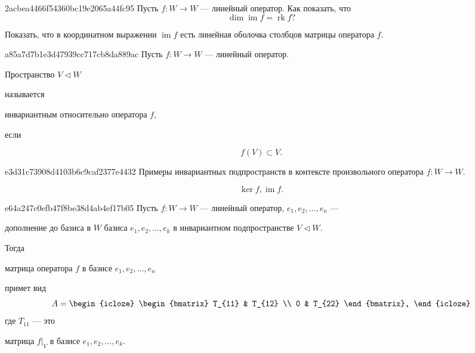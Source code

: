 \begin{note}{2acbea4466f54360bc19e2065a44fc95}
    Пусть \( f : W \to W \) --- линейный оператор. Как показать, что
    \[
        \dim \operatorname{im} f = \operatorname{rk} f?
    \]

    \begin{cloze}{1}
        Показать, что в координатном выражении \( \operatorname{im} f \) есть линейная оболочка столбцов матрицы оператора \( f \).
    \end{cloze}
\end{note}

\begin{note}{a85a7d7b1e3d47939cc717cb8da889ac}
    Пусть \( f : W \to W \) --- линейный оператор. \begin{icloze}{1}Пространство \( V \triangleleft W \)\end{icloze} называется \begin{icloze}{2}инвариантным относительно оператора \( f \),\end{icloze} если
    \begin{icloze}{1}\[
        f(V) \subset V.
    \]\end{icloze}
\end{note}

\begin{note}{e3d31c73908d4103b6c9caf2377e4432}
    Примеры инвариантных подпространств в контексте произвольного оператора \( f : W \to W \).

    \begin{cloze}{1}
        \[
            \ker f, \operatorname{im} f.
        \]
    \end{cloze}
\end{note}

\begin{note}{e64a247c0efb47f8be38d4ab4ef17b05}
    Пусть \( f : W \to W \) --- линейный оператор,  \( e_1,e_2, \ldots, e_n  \) --- \begin{icloze}{4}дополнение до базиса в \( W \) базиса \( e_1,e_2, \ldots, e_k  \) в инвариантном подпространстве \( V \triangleleft W \).\end{icloze} Тогда \begin{icloze}{3}матрица оператора \( f \) в базисе \( e_1,e_2, \ldots, e_n  \)\end{icloze} примет вид
    \[
        A = \begin{icloze}{1}
            \begin{bmatrix}
                T_{11} & T_{12} \\
                0 & T_{22}
            \end{bmatrix},
        \end{icloze}
    \]
    где \( T_{11}  \) --- это \begin{icloze}{2}матрица \( f |_{V}  \) в базисе \( e_1,e_2, \ldots, e_k  \).\end{icloze}
\end{note}

